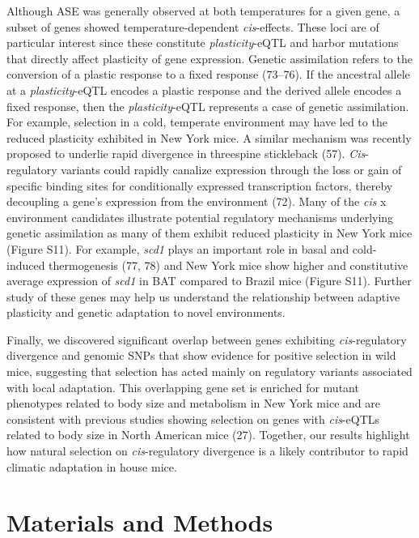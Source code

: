 \documentclass[9pt,twocolumn,twoside,lineno]{pnas-new}
\begin{document}
Although ASE was generally observed at both temperatures for a given
gene, a subset of genes showed temperature-dependent \emph{cis}-effects.
These loci are of particular interest since these constitute
\emph{plasticity}-eQTL and harbor mutations that directly affect
plasticity of gene expression. Genetic assimilation refers to the
conversion of a plastic response to a fixed response (73--76). If the
ancestral allele at a \emph{plasticity}-eQTL encodes a plastic response
and the derived allele encodes a fixed response, then the
\emph{plasticity}-eQTL represents a case of genetic assimilation. For
example, selection in a cold, temperate environment may have led to the
reduced plasticity exhibited in New York mice. A similar mechanism was
recently proposed to underlie rapid divergence in threespine stickleback
(57). \emph{Cis}-regulatory variants could rapidly canalize expression
through the loss or gain of specific binding sites for conditionally
expressed transcription factors, thereby decoupling a gene's expression
from the environment (72). Many of the \emph{cis} x environment
candidates illustrate potential regulatory mechanisms underlying genetic
assimilation as many of them exhibit reduced plasticity in New York mice
(Figure S11). For example, \emph{scd1} plays an important role in basal
and cold-induced thermogenesis (77, 78) and New York mice show higher
and constitutive average expression of \emph{scd1} in BAT compared to
Brazil mice (Figure S11). Further study of these genes may help us
understand the relationship between adaptive plasticity and genetic
adaptation to novel environments.

Finally, we discovered significant overlap between genes exhibiting
\emph{cis}-regulatory divergence and genomic SNPs that show evidence for
positive selection in wild mice, suggesting that selection has acted
mainly on regulatory variants associated with local adaptation. This
overlapping gene set is enriched for mutant phenotypes related to body
size and metabolism in New York mice and are consistent with previous
studies showing selection on genes with \emph{cis}-eQTLs related to body
size in North American mice (27). Together, our results highlight how
natural selection on \emph{cis}-regulatory divergence is a likely
contributor to rapid climatic adaptation in house mice.

\hypertarget{materials-and-methods}{%
\section*{Materials and Methods}\label{materials-and-methods}}
\end{document}
